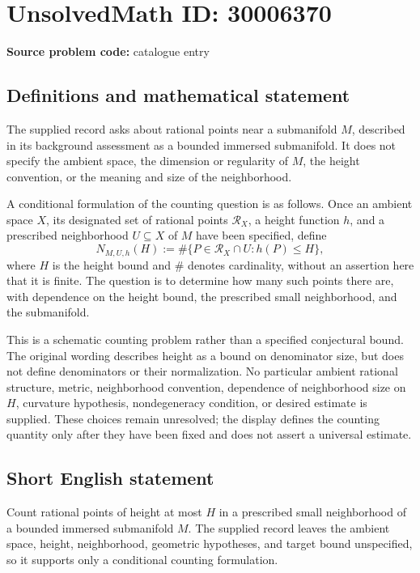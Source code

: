 \documentclass[11pt]{article}
\begin{document}
\section*{UnsolvedMath ID: 30006370}
\textbf{Source problem code:} catalogue entry
\subsection{Definitions and mathematical statement}
The supplied record asks about rational points near a submanifold \(M\), described in its background assessment as a bounded immersed submanifold. It does not specify the ambient space, the dimension or regularity of \(M\), the height convention, or the meaning and size of the neighborhood.

A conditional formulation of the counting question is as follows. Once an ambient space \(X\), its designated set of rational points \(\mathcal R_X\), a height function \(h\), and a prescribed neighborhood \(U\subseteq X\) of \(M\) have been specified, define
\[
N_{M,U,h}(H)
:=\#\bigl\{P\in\mathcal R_X\cap U:h(P)\le H\bigr\},
\]
where \(H\) is the height bound and \(\#\) denotes cardinality, without an assertion here that it is finite. The question is to determine how many such points there are, with dependence on the height bound, the prescribed small neighborhood, and the submanifold.

This is a schematic counting problem rather than a specified conjectural bound. The original wording describes height as a bound on denominator size, but does not define denominators or their normalization. No particular ambient rational structure, metric, neighborhood convention, dependence of neighborhood size on \(H\), curvature hypothesis, nondegeneracy condition, or desired estimate is supplied. These choices remain unresolved; the display defines the counting quantity only after they have been fixed and does not assert a universal estimate.
\subsection{Short English statement}
Count rational points of height at most \(H\) in a prescribed small neighborhood of a bounded immersed submanifold \(M\). The supplied record leaves the ambient space, height, neighborhood, geometric hypotheses, and target bound unspecified, so it supports only a conditional counting formulation.
\end{document}
